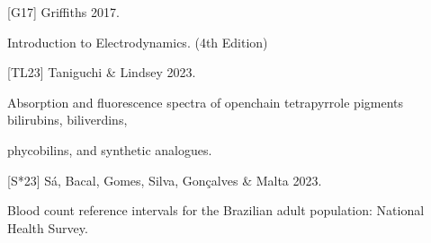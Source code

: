 \documentclass[letterpaper,10pt,english]{sphinxmanual}
\begin{document}
\begin{DUlineblock}{0em}
\item[] {[}G17{]} Griffiths 2017.
\item[] Introduction to Electrodynamics. (4th Edition)
\item[] 
\end{DUlineblock}

\begin{DUlineblock}{0em}
\item[] {[}TL23{]} Taniguchi \& Lindsey 2023.
\item[] Absorption and fluorescence spectra of open\sphinxhyphen{}chain tetrapyrrole pigments \textendash{} bilirubins, biliverdins,
\item[] phycobilins, and synthetic analogues.
\item[] 
\end{DUlineblock}

\begin{DUlineblock}{0em}
\item[] {[}S*23{]} Sá, Bacal, Gomes, Silva, Gonçalves \& Malta 2023.
\item[] Blood count reference intervals for the Brazilian adult population: National Health Survey.
\item[] 
\end{DUlineblock}
\end{document}
